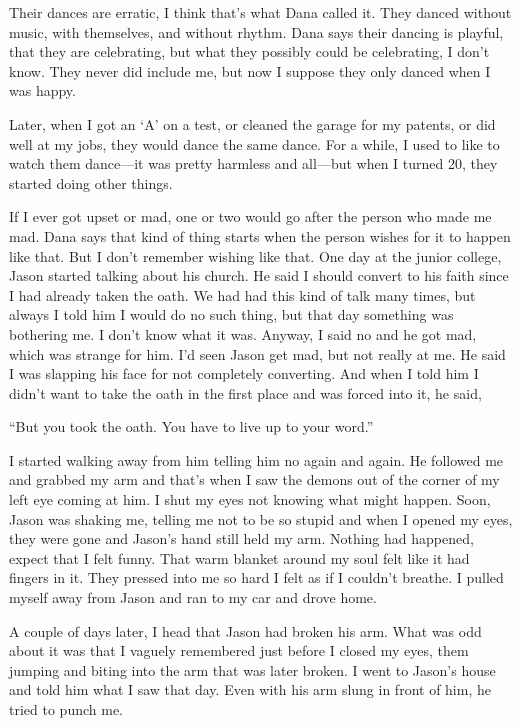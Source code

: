 \documentclass[
]{article}
\begin{document}
Their dances are erratic, I think that's what Dana called it. They
danced without music, with themselves, and without rhythm. Dana says
their dancing is playful, that they are celebrating, but what they
possibly could be celebrating, I don't know. They never did include me,
but now I suppose they only danced when I was happy.

Later, when I got an `A' on a test, or cleaned the garage for my
patents, or did well at my jobs, they would dance the same dance. For a
while, I used to like to watch them dance---it was pretty harmless and
all---but when I turned 20, they started doing other things.

If I ever got upset or mad, one or two would go after the person who
made me mad. Dana says that kind of thing starts when the person wishes
for it to happen like that. But I don't remember wishing like that. One
day at the junior college, Jason started talking about his church. He
said I should convert to his faith since I had already taken the oath.
We had had this kind of talk many times, but always I told him I would
do no such thing, but that day something was bothering me. I don't know
what it was. Anyway, I said no and he got mad, which was strange for
him. I'd seen Jason get mad, but not really at me. He said I was
slapping his face for not completely converting. And when I told him I
didn't want to take the oath in the first place and was forced into it,
he said,

``But you took the oath. You have to live up to your word.''

I started walking away from him telling him no again and again. He
followed me and grabbed my arm and that's when I saw the demons out of
the corner of my left eye coming at him. I shut my eyes not knowing what
might happen. Soon, Jason was shaking me, telling me not to be so stupid
and when I opened my eyes, they were gone and Jason's hand still held my
arm. Nothing had happened, expect that I felt funny. That warm blanket
around my soul felt like it had fingers in it. They pressed into me so
hard I felt as if I couldn't breathe. I pulled myself away from Jason
and ran to my car and drove home.

A couple of days later, I head that Jason had broken his arm. What was
odd about it was that I vaguely remembered just before I closed my eyes,
them jumping and biting into the arm that was later broken. I went to
Jason's house and told him what I saw that day. Even with his arm slung
in front of him, he tried to punch me.
\end{document}
